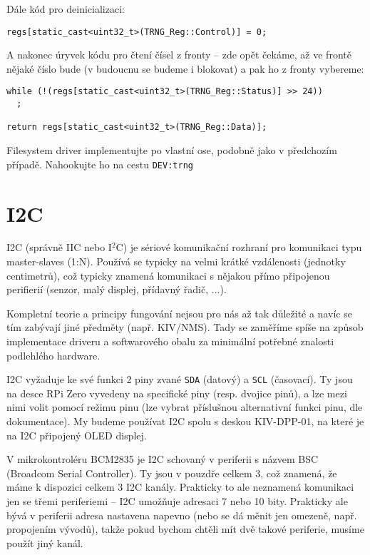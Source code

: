 \documentclass{article}
\begin{document}
Dále kód pro deinicializaci:
\begin{lstlisting}
regs[static_cast<uint32_t>(TRNG_Reg::Control)] = 0;
\end{lstlisting}

A nakonec úryvek kódu pro čtení čísel z fronty -- zde opět čekáme, až ve frontě nějaké číslo bude (v budoucnu se budeme i blokovat) a pak ho z fronty vybereme:
\begin{lstlisting}
while (!(regs[static_cast<uint32_t>(TRNG_Reg::Status)] >> 24))
  ;

return regs[static_cast<uint32_t>(TRNG_Reg::Data)];
\end{lstlisting}

Filesystem driver implementujte po vlastní ose, podobně jako v předchozím případě. Nahookujte ho na cestu \texttt{DEV:trng}

\section{I2C}

I2C (správně IIC nebo I$^2$C) je sériové komunikační rozhraní pro komunikaci typu master-slaves (1:N). Používá se typicky na velmi krátké vzdálenosti (jednotky centimetrů), což typicky znamená komunikaci s nějakou přímo připojenou perifierií (senzor, malý displej, přídavný řadič, ...).

Kompletní teorie a principy fungování nejsou pro nás až tak důležité a navíc se tím zabývají jiné předměty (např. KIV/NMS). Tady se zaměříme spíše na způsob implementace driveru a softwarového obalu za minimální potřebné znalosti podlehlého hardware.

I2C vyžaduje ke své funkci 2 piny zvané \texttt{SDA} (datový) a \texttt{SCL} (časovací). Ty jsou na desce RPi Zero vyvedeny na specifické piny (resp. dvojice pinů), a lze mezi nimi volit pomocí režimu pinu (lze vybrat příslušnou alternativní funkci pinu, dle dokumentace). My budeme používat I2C spolu s deskou KIV-DPP-01, na které je na I2C připojený OLED displej.

V mikrokontroléru BCM2835 je I2C schovaný v periferii s názvem BSC (Broadcom Serial Controller). Ty jsou v pouzdře celkem 3, což znamená, že máme k dispozici celkem 3 I2C kanály. Prakticky to ale neznamená komunikaci jen se třemi periferiemi -- I2C umožňuje adresaci 7 nebo 10 bity. Prakticky ale bývá v periferii adresa nastavena napevno (nebo se dá měnit jen omezeně, např. propojením vývodů), takže pokud bychom chtěli mít dvě takové periferie, musíme použít jiný kanál.
\end{document}
